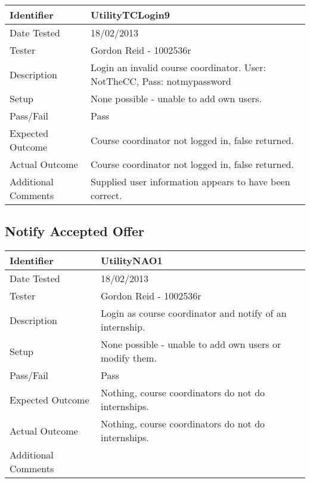 \documentclass[11pt]{l3deliverable}
\begin{document}
\begin{tabularx}{\textwidth}{|T|L|}
\hline
Identifier & UtilityTCLogin9\\
\hline
Date Tested & 18/02/2013\\
\hline
Tester & Gordon Reid - 1002536r\\
\hline
Description & Login an invalid course coordinator. User: NotTheCC, Pass: 
notmypassword\\
\hline
Setup & None possible - unable to add own users.\\
\hline
Pass/Fail & Pass\\
\hline
Expected Outcome & Course coordinator not logged in, false returned.\\
\hline
Actual Outcome & Course coordinator not logged in, false returned.\\
\hline
Additional Comments & Supplied user information appears to have been correct.\\
\hline
\end{tabularx}

\newpage

\subsection{Notify Accepted Offer}

\begin{tabularx}{\textwidth}{|T|L|}
\hline
Identifier & UtilityNAO1\\
\hline
Date Tested & 18/02/2013\\
\hline
Tester & Gordon Reid - 1002536r\\
\hline
Description & Login as course coordinator and notify of an internship.\\
\hline
Setup & None possible - unable to add own users or modify them.\\
\hline
Pass/Fail & Pass\\
\hline
Expected Outcome & Nothing, course coordinators do not do internships.\\
\hline
Actual Outcome & Nothing, course coordinators do not do internships.\\
\hline
Additional Comments &\\
\hline
\end{tabularx}

\vspace{2em}
\end{document}
